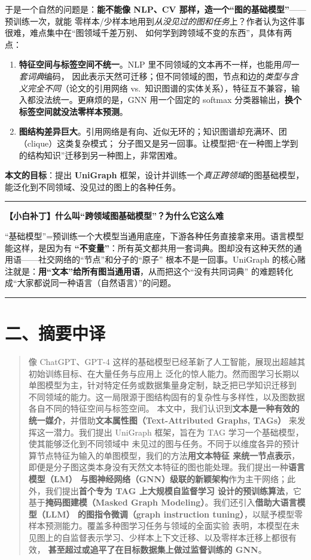 \documentclass[11pt,UTF8,fontset=fandol]{ctexart}
\newenvironment{tip}[1]{%
  \par\smallskip\noindent\rule{\linewidth}{0.4pt}\par\nobreak
  \noindent\textbf{【小白补丁】#1}\par\nobreak\noindent\ignorespaces
}{%
  \par\noindent\rule{\linewidth}{0.4pt}\par\smallskip
}
\begin{document}
于是一个自然的问题是：\textbf{能不能像 NLP、CV 那样，造一个“图的基础模型”}——预训练一次，就能
零样本/少样本地用到\emph{从没见过的图和任务}上？作者认为这件事很难，难点集中在“图领域千差万别、
如何学到跨领域不变的东西”，具体有两点：

\begin{enumerate}[leftmargin=2em]
  \item \textbf{特征空间与标签空间不统一}。NLP 里不同领域的文本再不一样，也能用\emph{同一套词典}编码，
        因此表示天然可迁移；但不同领域的图，节点和边的\emph{类型与含义完全不同}（论文的引用网络
        vs.\ 知识图谱的实体关系），特征互不兼容，输入都没法统一。更麻烦的是，GNN 用一个固定的
        softmax 分类器输出，\textbf{换个标签空间就没法零样本预测}。
  \item \textbf{图结构差异巨大}。引用网络是有向、近似无环的；知识图谱却充满环、团（clique）这类复杂模式；
        分子图又是另一回事。让模型把“在一种图上学到的结构知识”迁移到另一种图上，非常困难。
\end{enumerate}

\textbf{本文的目标}：提出 \textbf{UniGraph} 框架，设计并训练一个\emph{真正跨领域}的图基础模型，
能泛化到不同领域、没见过的图上的各种任务。

\begin{tip}{什么叫“跨领域图基础模型”？为什么它这么难}
“基础模型”=预训练一个大模型当通用底座，下游各种任务直接拿来用。语言模型能这样，是因为有
\textbf{“不变量”}：所有英文都共用一套词典。图却没有这种天然的通用语——社交网络的“节点”和分子的“原子”
根本不是一回事。UniGraph 的核心赌注就是：\textbf{用“文本”给所有图当通用语}，从而把这个“没有共同词典”
的难题转化成“大家都说同一种语言（自然语言）”的问题。
\end{tip}

\section{二、摘要中译}

\begin{quote}
像 ChatGPT、GPT-4 这样的基础模型已经革新了人工智能，展现出超越其初始训练目标、在大量任务与应用上
泛化的惊人能力。然而图学习长期以单图模型为主，针对特定任务或数据集量身定制，缺乏把已学知识迁移到
不同领域的能力。这一局限源于图结构固有的复杂性与多样性，以及图数据各自不同的特征空间与标签空间。
本文中，我们认识到\textbf{文本是一种有效的统一媒介}，并借助\textbf{文本属性图（Text-Attributed Graphs, TAGs）}
来发挥这一潜力。我们提出 UniGraph 框架，旨在为 TAG 学习一个基础模型，使其能够泛化到不同领域中
未见过的图与任务。不同于以维度各异的预计算节点特征为输入的单图模型，我们的方法\textbf{用文本特征
来统一节点表示}，即便是分子图这类本身没有天然文本特征的图也能处理。我们提出一种\textbf{语言模型（LM）
与图神经网络（GNN）级联的新颖架构}作为主干网络；此外，我们提出\textbf{首个专为 TAG 上大规模自监督学习
设计的预训练算法}，它基于\textbf{掩码图建模（Masked Graph Modeling）}。我们还引入\textbf{借助大语言模型（LLM）
的图指令微调（graph instruction tuning）}，以赋予模型零样本预测能力。覆盖多种图学习任务与领域的全面实验
表明，本模型在未见图上的自监督表示学习、少样本上下文迁移、以及零样本迁移上都很有效，
\textbf{甚至超过或追平了在目标数据集上做过监督训练的 GNN}。
\end{quote}
\end{document}
